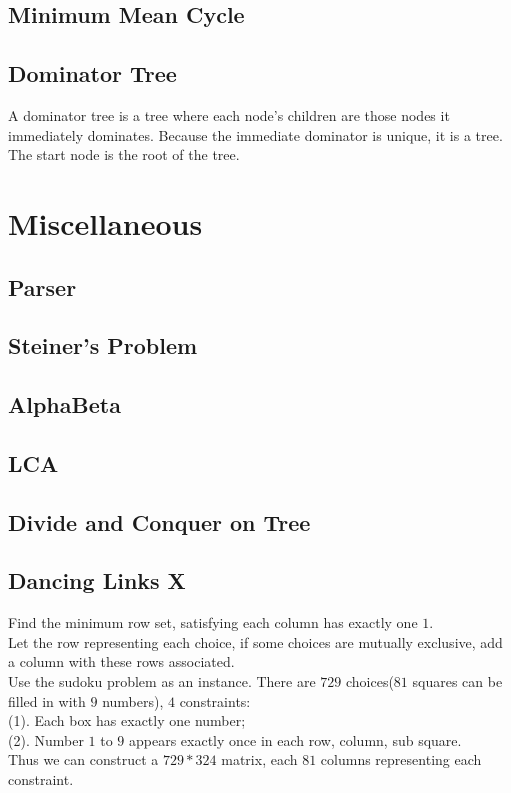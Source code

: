 \documentclass[10pt]{article}
\begin{document}
\subsection{Minimum Mean Cycle}

\subsection{Dominator Tree}
\noindent
A dominator tree is a tree where each node's children are those nodes it immediately dominates. Because the immediate dominator is unique, it is a tree. The start node is the root of the tree.


\section{Miscellaneous}
% 
\subsection{Parser}

\subsection{Steiner's Problem}

\subsection{AlphaBeta}

\subsection{LCA}

\subsection{Divide and Conquer on Tree}

\subsection{Dancing Links X}

Find the minimum row set, satisfying each column has exactly one $1$. \\
Let the row representing each choice, if some choices are mutually exclusive, add a column with these rows associated. \\
Use the sudoku problem as an instance. There are $729$ choices($81$ squares can be filled in with $9$ numbers), $4$ constraints:\\
(1). Each box has exactly one number; \\
(2). Number $1$ to $9$ appears exactly once in each row, column, sub square. \\
Thus we can construct a $729*324$ matrix, each $81$ columns representing each constraint.\\
\end{document}
